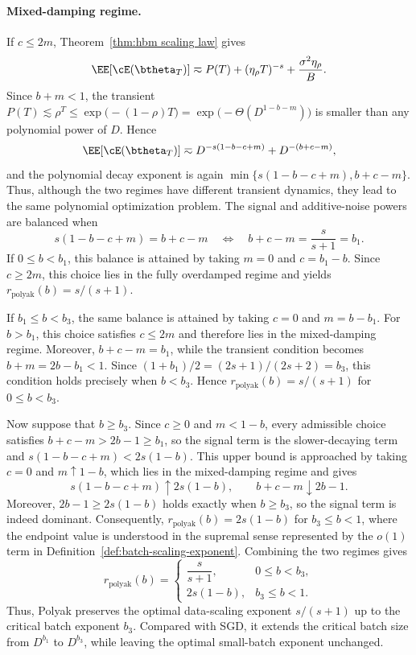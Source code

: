 \documentclass[11pt]{article}
\newcommand{\polyak}{\mathrm{polyak}}
\begin{document}
\paragraph{Mixed-damping regime.} If $c\le2m$, Theorem~\ref{thm:hbm scaling law} gives
\[
\EE[\cE(\btheta_T)]\eqsim P(T)+(\eta_\rho T)^{-s}+\frac{\sigma^2\eta_\rho}{B}.
\]
Since $b+m<1$, the transient $P(T)\lesssim\rho^T\leq
\exp\bigl(-(1-\rho)T\bigr)=\exp\bigl(-\Theta(D^{1-b-m})\bigr)$ is smaller than any polynomial power of $D$. Hence
\[
\EE[\cE(\btheta_T)]\eqsim D^{-s(1-b-c+m)}+D^{-(b+c-m)},
\]
and the polynomial decay exponent is again $\min\{s(1-b-c+m),b+c-m\}$. Thus, although the two regimes have different transient dynamics, they lead to the same polynomial optimization problem. The signal and additive-noise powers are balanced when
\[
s(1-b-c+m)=b+c-m
\quad\Longleftrightarrow\quad
b+c-m=\frac{s}{s+1}=b_1.
\]
If $0\le b<b_1$, this balance is attained by taking $m=0$ and $c=b_1-b$. Since $c\ge2m$, this choice lies in the fully overdamped regime and yields $r_{\polyak}(b)=s/(s+1)$. 

If $b_1\le b<b_3$, the same balance is attained by taking $c=0$ and $m=b-b_1$. For $b>b_1$, this choice satisfies $c\le2m$ and therefore lies in the mixed-damping regime. Moreover, $b+c-m=b_1$, while the transient condition becomes $b+m=2b-b_1<1$. Since $(1+b_1)/2=(2s+1)/(2s+2)=b_3$, this condition holds precisely when $b<b_3$. Hence $r_{\polyak}(b)=s/(s+1)$ for $0\le b<b_3$.

Now suppose that $b\ge b_3$. Since $c\ge0$ and $m<1-b$, every admissible choice satisfies $b+c-m>2b-1\ge b_1$, so the signal term is the slower-decaying term and $s(1-b-c+m)<2s(1-b)$. This upper bound is approached by taking $c=0$ and $m\uparrow1-b$, which lies in the mixed-damping regime and gives
\[
s(1-b-c+m)\uparrow2s(1-b),\qquad b+c-m\downarrow2b-1.
\]
Moreover, $2b-1\ge2s(1-b)$ holds exactly when $b\ge b_3$, so the signal term is indeed dominant. Consequently, $r_{\polyak}(b)=2s(1-b)$ for $b_3\le b<1$, where the endpoint value is understood in the supremal sense represented by the $o(1)$ term in Definition~\ref{def:batch-scaling-exponent}. Combining the two regimes gives
\[
r_{\polyak}(b)=
\begin{cases}
\dfrac{s}{s+1},&0\le b<b_3,\\[4pt]
2s(1-b),&b_3\le b<1.
\end{cases}
\]
Thus, Polyak preserves the optimal data-scaling exponent $s/(s+1)$ up to the critical batch exponent $b_3$. Compared with SGD, it extends the critical batch size from $D^{b_1}$ to $D^{b_3}$, while leaving the optimal small-batch exponent unchanged.
\end{document}
